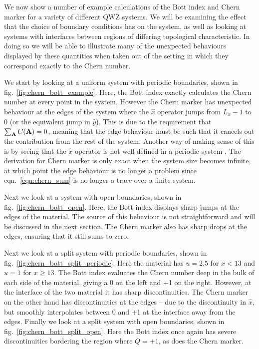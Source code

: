 We now show a number of example calculations of the Bott index and Chern marker for a variety of different QWZ systems. We will be examining the effect that the choice of boundary conditions has on the system, as well as looking at systems with interfaces between regions of differing topological characteristic. In doing so we will be able to illustrate many of the unexpected behaviours displayed by these quantities when taken out of the setting in which they correspond exactly to the Chern number.\par
We start by looking at a uniform system with periodic boundaries, shown in fig.~\ref{fig:chern_bott_example}. Here, the Bott index exactly calculates the Chern number at every point in the system. However the Chern marker has unexpected behaviour at the edges of the system where the $\hat x$ operator jumps from $L_x-1$ to 0 (or the equivalent jump in $\hat y$). This is due to the requirement that $\sum_{\bf A} C(\bf A) = 0$, meaning that the edge behaviour must be such that it cancels out the contribution from the rest of the system. Another way of making sense of this is by seeing that the $\hat x$ operator is not well-defined in a periodic system \cite{resta_quantum-mechanical_1998}. The derivation for Chern marker is only exact when the system size becomes infinite, at which point the edge behaviour is no longer a problem since eqn.~\ref{eqn:chern_sum} is no longer a trace over a finite system.\par
Next we look at a system with open boundaries, shown in fig.~\ref{fig:chern_bott_open}. Here, the Bott index displays sharp jumps at the edges of the material. The source of this behaviour is not straightforward and will be discussed in the next section. The Chern marker also has sharp drops at the edges, ensuring that it still sums to zero. \par
Next we look at a split system with periodic boundaries, shown in fig.~\ref{fig:chern_bott_split_periodic}. Here the material has $u = 2.5$ for $x <13$ and $u = 1$ for  $x\geq13$. The Bott index evaluates the Chern number deep in the bulk of each side of the material, giving a 0 on the left and +1 on the right. However, at the interface of the two material it has sharp discontinuities. The Chern marker on the other hand has discontinuities at the edges -- due to the discontinuity in $\hat x$, but smoothly interpolates between 0 and +1 at the interface away from the edges. Finally we look at a split system with open boundaries, shown in fig.~\ref{fig:chern_bott_split_open}. Here the Bott index once again has severe discontinuities bordering the region where $Q = +1$, as does the Chern marker.\par
